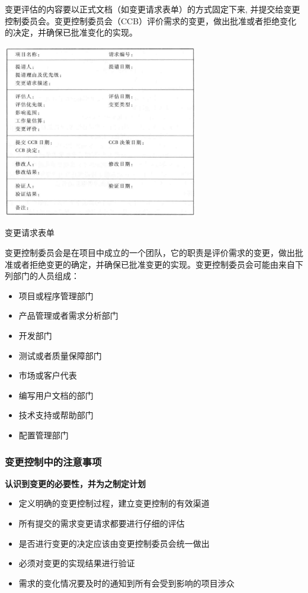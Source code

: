 变更评估的内容要以正式文档（如变更请求表单）的方式固定下来, 并提交给变更控制委员会。变更控制委员会（CCB）评价需求的变更，做出批准或者拒绝变化的决定，并确保已批准变化的实现。

\begin{table}
    \centering
    \vspace{-2em}
    \includegraphics[width=8.5cm]{img/变更请求表单.png}
    \caption*{变更请求表单}
    \vspace{-5em}
\end{table}

变更控制委员会是在项目中成立的一个团队，它的职责是评价需求的变更，做出批准或者拒绝变更的确定，并确保已批准变更的实现。变更控制委员会可能由来自下列部门的人员组成：
\begin{itemize}
    \item 项目或程序管理部门
    \item 产品管理或者需求分析部门
    \item 开发部门
    \item 测试或者质量保障部门
    \item 市场或客户代表
    \item 编写用户文档的部门
    \item 技术支持或帮助部门
    \item 配置管理部门
\end{itemize}

\subsubsection{变更控制中的注意事项}
\textbf{认识到变更的必要性，并为之制定计划}
\begin{itemize}
    \item 定义明确的变更控制过程，建立变更控制的有效渠道
    \item 所有提交的需求变更请求都要进行仔细的评估
    \item 是否进行变更的决定应该由变更控制委员会统一做出
    \item 必须对变更的实现结果进行验证
    \item 需求的变化情况要及时的通知到所有会受到影响的项目涉众
\end{itemize}


